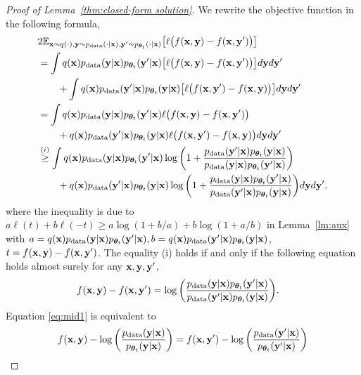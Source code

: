 \documentclass{article}
\begin{document}
\begin{proof}[Proof of Lemma~\ref{thm:closed-form solution}]
We rewrite the objective function in the following formula, 
\begin{align*}
&2\mathbb{E}_{\mathbf{x}\sim q(\cdot), \mathbf{y}\sim p_{\mathrm{data}}(\cdot|\mathbf{x}), \mathbf{y}'\sim p_{\bm{\theta}_t}(\cdot|\mathbf{x})}\big[ \ell\big(f(\mathbf{x}, \mathbf{y}) - f(\mathbf{x}, \mathbf{y}')\big) 
\big] \notag\\
&= \int q(\mathbf{x})p_{\mathrm{data}}(\mathbf{y}|\mathbf{x})p_{\bm{\theta}_{t}}(\mathbf{y}'|\mathbf{x})\big[ \ell\big(f(\mathbf{x}, \mathbf{y}) - f(\mathbf{x}, \mathbf{y}')\big) 
\big]d\mathbf{y} d\mathbf{y}' \notag\\
&\qquad + \int q(\mathbf{x})p_{\mathrm{data}}(\mathbf{y}'|\mathbf{x})p_{\bm{\theta}_{t}}(\mathbf{y}|\mathbf{x})\big[ \ell\big(f(\mathbf{x}, \mathbf{y}') - f(\mathbf{x}, \mathbf{y})\big) 
\big]d\mathbf{y} d\mathbf{y}' \notag\\
&= \int q(\mathbf{x})p_{\mathrm{data}}(\mathbf{y}|\mathbf{x})p_{\bm{\theta}_{t}}(\mathbf{y}'|\mathbf{x}) \ell\big(f(\mathbf{x}, \mathbf{y}) - f(\mathbf{x}, \mathbf{y}')\big) 
 \notag\\
&\qquad + q(\mathbf{x})p_{\mathrm{data}}(\mathbf{y}'|\mathbf{x})p_{\bm{\theta}_{t}}(\mathbf{y}|\mathbf{x}) \ell\big(f(\mathbf{x}, \mathbf{y}') - f(\mathbf{x}, \mathbf{y})\big) 
d\mathbf{y} d\mathbf{y}' \notag\\
&\overset{(i)}{\geq} \int q(\mathbf{x})p_{\mathrm{data}}(\mathbf{y}|\mathbf{x})p_{\bm{\theta}_{t}}(\mathbf{y}'|\mathbf{x}) \log\bigg(1 + \frac{p_{\mathrm{data}}(\mathbf{y}'|\mathbf{x})p_{\bm{\theta}_{t}}(\mathbf{y}|\mathbf{x})}{p_{\mathrm{data}}(\mathbf{y}|\mathbf{x})p_{\bm{\theta}_{t}}(\mathbf{y}'|\mathbf{x}) }\bigg) 
 \notag\\
&\qquad + q(\mathbf{x})p_{\mathrm{data}}(\mathbf{y}'|\mathbf{x})p_{\bm{\theta}_{t}}(\mathbf{y}|\mathbf{x}) \log\bigg(1 + \frac{p_{\mathrm{data}}(\mathbf{y}|\mathbf{x})p_{\bm{\theta}_{t}}(\mathbf{y}'|\mathbf{x})}{p_{\mathrm{data}}(\mathbf{y}'|\mathbf{x})p_{\bm{\theta}_{t}}(\mathbf{y}|\mathbf{x})}\bigg)   
d\mathbf{y} d\mathbf{y}',
\end{align*}  
where the inequality is due to $ a\ell(t) + b\ell(-t) \geq a\log(1+b/a) + b\log(1+a/b)$ in Lemma~\ref{lm:aux} with $a = q(\mathbf{x})p_{\mathrm{data}}(\mathbf{y}|\mathbf{x})p_{\bm{\theta}_{t}}(\mathbf{y}'|\mathbf{x}), b = q(\mathbf{x})p_{\mathrm{data}}(\mathbf{y}'|\mathbf{x})p_{\bm{\theta}_{t}}(\mathbf{y}|\mathbf{x})$, $t = f(\mathbf{x}, \mathbf{y}) - f(\mathbf{x}, \mathbf{y}')$. The equality (i)  holds if and only if the following equation holds almost surely for any $\mathbf{x}, \mathbf{y}, \mathbf{y}'$, 
\begin{align}
&f(\mathbf{x}, \mathbf{y}) - f(\mathbf{x}, \mathbf{y}') = \log\bigg(\frac{p_{\mathrm{data}}(\mathbf{y}|\mathbf{x})p_{\bm{\theta}_{t}}(\mathbf{y}'|\mathbf{x})}{p_{\mathrm{data}}(\mathbf{y}'|\mathbf{x})p_{\bm{\theta}_{t}}(\mathbf{y}|\mathbf{x})}\bigg). \label{eq:mid1}
\end{align}
Equation \eqref{eq:mid1} is equivalent to
\begin{align*}
f(\mathbf{x}, \mathbf{y}) - \log\bigg(\frac{p_{\mathrm{data}}(\mathbf{y}|\mathbf{x})}{p_{\bm{\theta}_{t}}(\mathbf{y}|\mathbf{x})}\bigg) = f(\mathbf{x}, \mathbf{y}') - \log\bigg(\frac{p_{\mathrm{data}}(\mathbf{y}'|\mathbf{x})}{p_{\bm{\theta}_{t}}(\mathbf{y}'|\mathbf{x})}\bigg)
\end{align*}

\end{proof}
\end{document}
